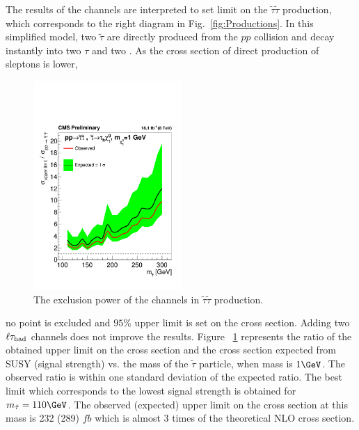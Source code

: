 The results of the \tauTau channels are interpreted to set limit on the $\tilde{\tau}\tilde{\tau}$ production, which corresponds to the right diagram in Fig.~\ref{fig:Productions}. In this simplified model, two $\tilde{\tau}$ are directly produced from the $pp$ collision and decay instantly into two $\tau$ and two \PSGczDo. As the cross section of direct production of sleptons is lower,
\begin{linenomath}
\begin{figure}[h]
\centering
\includegraphics[width=0.5\textwidth,keepaspectratio=true]{StatisticsFig/ExclusionSTauSTauLsp1.pdf}
\caption{The exclusion power of the \tauTau channels in $\tilde{\tau}\tilde{\tau}$ production.}
\label{fig:limit_stau_stau}
\end{figure}
\end{linenomath}
 no point is excluded and $95\%$ upper limit is set on the cross section. Adding two $\ell\tau_{\rm had}$ channels does not improve the results.
Figure ~\ref{fig:limit_stau_stau} represents the ratio of the 
obtained upper limit on the cross section and the cross section expected from SUSY (signal strength) vs. the mass of the $\tilde{\tau}$ particle, when \PSGczDo mass is $1 \GeV$.
The observed ratio is within one standard deviation of  the expected ratio.
The best limit which corresponds to the lowest signal strength is obtained for $m_{\tilde{\tau}}=110 \GeV$. The observed (expected) upper limit on the cross section at this mass is 232 (289) $fb$ which is almost 3 times of the theoretical NLO cross section.


